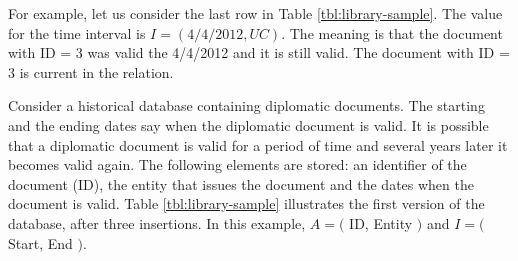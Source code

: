 
For example, let us consider the last row in Table \ref{tbl:library-sample}. The value for the time interval is $I = \left(4/4/2012 , UC \right)$. The meaning is that the document with ID = 3 was valid the  4/4/2012 and it is still valid. The document with ID = 3 is current in the relation.


\begin{example}
\label{ex:library-database}
 Consider a historical database containing diplomatic documents. The starting and the ending dates say when the diplomatic document is valid. It is possible that a diplomatic document is valid for a period of time and several years later it becomes valid again. The following elements are stored: an identifier of the document (ID), the entity that issues the document and the dates when the document is valid. Table \ref{tbl:library-sample} illustrates the first version of the database, after three insertions. In this example, $A = ($ ID, Entity $)$ and $I = ($ Start, End $)$.
\end{example}




